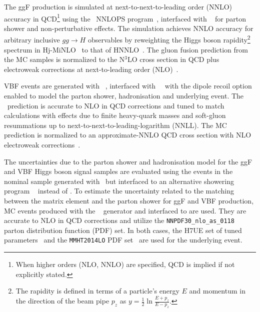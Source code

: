 The ggF production is simulated at next-to-next-to-leading order (NNLO) accuracy in QCD\footnote{When higher orders (NLO, NNLO) are specified, QCD is implied if not explicitly stated.} using the \POWHEG~NNLOPS program~\cite{Nason:2004rx, Frixione:2007vw, Alioli:2010xd, Hamilton:2013fea, Hamilton:2015nsa}, interfaced with ~\cite{Sjostrand:2014zea} for parton shower and non-perturbative effects.
The simulation achieves NNLO accuracy for arbitrary inclusive $gg\to H$ observables by reweighting the Higgs boson rapidity\footnote{The rapidity is defined in terms of a particle's energy $E$ and momentum in the direction of the beam pipe $p_z$ as $y = \frac{1}{2}\ln\frac{E+p_z}{E-p_z}$.} spectrum in Hj-MiNLO~\cite{Hamilton:2012np, Campbell:2012am, Hamilton:2012rf} to that of HNNLO~\cite{Catani:2007vq}.
The gluon fusion prediction from the MC samples is normalized to the N$^3$LO cross section in QCD plus electroweak corrections at next-to-leading order (NLO)~\cite{deFlorian:2016spz, Anastasiou:2016cez, Anastasiou:2015vya, Dulat:2018rbf, Harlander:2009mq, Harlander:2009bw, Harlander:2009my, Pak:2009dg, Actis:2008ug, Actis:2008ts, Bonetti:2018ukf}.

VBF events are generated with \POWHEG~\cite{Nason:2004rx, Frixione:2007vw, Alioli:2010xd, Nason:2009ai}, interfaced with ~\cite{Sjostrand:2014zea}~with the dipole recoil option enabled to model the parton shower, hadronisation and underlying event.
The \POWHEG\ prediction is accurate to NLO in QCD corrections and tuned to match calculations with effects due to finite heavy-quark masses and soft-gluon resummations up to next-to-next-to-leading-logarithm (NNLL).
The MC prediction is normalized to an approximate-NNLO QCD cross section with NLO electroweak corrections~\cite{PhysRevLett.99.161803, Ciccolini:2007ec, PhysRevLett.105.011801}.

The uncertainties due to the parton shower and hadronisation model for the ggF and VBF Higgs boson signal samples are
evaluated using the events in the nominal sample generated with \POWHEG\ but interfaced to an alternative showering program
~\cite{Bahr:2008pv,Bellm:2015jjp} instead of . To estimate the uncertainty related to the matching between the matrix element and the parton shower for ggF and VBF production, MC events produced with the \MGFiveNLO~\cite{Alwall:2014hca} generator and interfaced to  are used. They are accurate to NLO in QCD corrections and utilize the \texttt{NNPDF30\_nlo\_as\_0118}~\cite{Ball:2014uwa} parton distribution function (PDF) set.
In both cases, the H7UE set of tuned parameters~\cite{Bellm:2015jjp} and the \texttt{MMHT2014LO} PDF set~\cite{Harland-Lang:2014zoa} are used for the underlying event.

